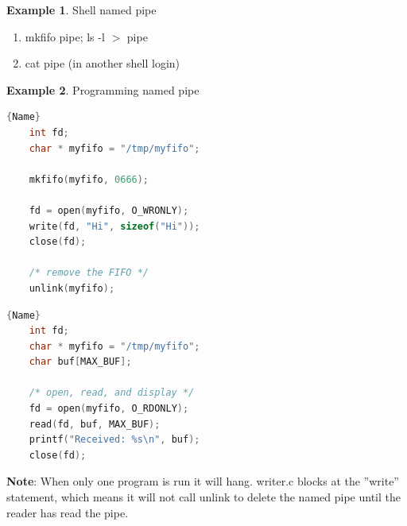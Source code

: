 \documentclass[12pt,a4paper]{article}
\theoremstyle{definition}
\newtheorem{example}{Example}[section]
\newenvironment{myenumerate}
{ \begin{enumerate}
    \setlength{\itemsep}{5pt}
    \setlength{\parskip}{0pt}
    \setlength{\parsep}{0pt}     }
{ \end{enumerate}                }
\begin{document}
\begin{example}{Shell named pipe}
	\begin{myenumerate}
		\item \textsf{mkfifo pipe; ls -l $>$ pipe}
		\item \textsf{cat pipe} (in another shell login)
	\end{myenumerate}
\end{example}

\begin{example}{Programming named pipe}

\noindent\begin{minipage}{.48\textwidth}
\begin{lstlisting}[caption=writer.c,frame=tlrb,language=C]{Name}
    int fd;
    char * myfifo = "/tmp/myfifo";

    mkfifo(myfifo, 0666);

    fd = open(myfifo, O_WRONLY);
    write(fd, "Hi", sizeof("Hi"));
    close(fd);

    /* remove the FIFO */
    unlink(myfifo);
\end{lstlisting}
\end{minipage}\hfill
\begin{minipage}{.48\textwidth}
\begin{lstlisting}[caption=reader.c,frame=tlrb,language=C]{Name}
    int fd;
    char * myfifo = "/tmp/myfifo";
    char buf[MAX_BUF];

    /* open, read, and display */
    fd = open(myfifo, O_RDONLY);
    read(fd, buf, MAX_BUF);
    printf("Received: %s\n", buf);
    close(fd);

\end{lstlisting}
\end{minipage}
\textbf{Note}: When only one program is run it will hang. writer.c blocks at the ''write'' statement, which means it will not call unlink to delete the named pipe until the reader has read the pipe.

\end{example}


\end{document}
